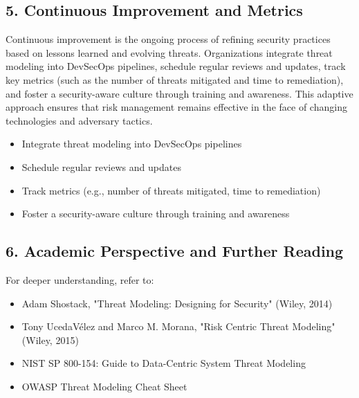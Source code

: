 \subsection*{5. Continuous Improvement and Metrics}
Continuous improvement is the ongoing process of refining security practices based on lessons learned and evolving threats\cite{owasp}. Organizations integrate threat modeling into DevSecOps pipelines, schedule regular reviews and updates, track key metrics (such as the number of threats mitigated and time to remediation), and foster a security-aware culture through training and awareness. This adaptive approach ensures that risk management remains effective in the face of changing technologies and adversary tactics.
\begin{itemize}
	\item Integrate threat modeling into DevSecOps pipelines
	\item Schedule regular reviews and updates
	\item Track metrics (e.g., number of threats mitigated, time to remediation)
	\item Foster a security-aware culture through training and awareness
\end{itemize}

\subsection*{6. Academic Perspective and Further Reading}
For deeper understanding, refer to:
\begin{itemize}
	\item Adam Shostack, "Threat Modeling: Designing for Security" (Wiley, 2014)
	\item Tony UcedaVélez and Marco M. Morana, "Risk Centric Threat Modeling" (Wiley, 2015)
	\item NIST SP 800-154: Guide to Data-Centric System Threat Modeling
	\item OWASP Threat Modeling Cheat Sheet
\end{itemize}

